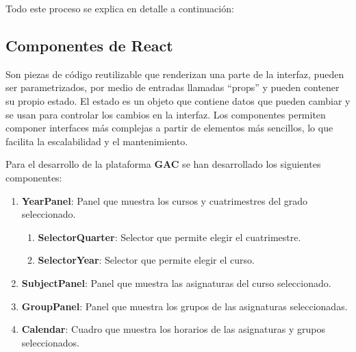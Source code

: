 Todo este proceso se explica en detalle a continuación:\newline

\subsection{Componentes de React}

Son piezas de código reutilizable que renderizan una parte de la interfaz, pueden ser parametrizados, por medio de entradas llamadas ``props'' y pueden contener su propio estado. El estado es un objeto que contiene datos que pueden cambiar y se usan para controlar los cambios en la interfaz. Los componentes permiten componer interfaces más complejas a partir de elementos más sencillos, lo que facilita la escalabilidad y el mantenimiento.\newline


Para el desarrollo de la plataforma \textbf{GAC} se han desarrollado los siguientes componentes:

\begin{enumerate}
    \item \textbf{YearPanel}: Panel que muestra los cursos y cuatrimestres del grado seleccionado.
    \begin{enumerate}
        \item \textbf{SelectorQuarter}: Selector que permite elegir el cuatrimestre.
        \item \textbf{SelectorYear}: Selector que permite elegir el curso.
    \end{enumerate}
    \item \textbf{SubjectPanel}: Panel que muestra las asignaturas del curso seleccionado.
    \item \textbf{GroupPanel}: Panel que muestra los grupos de las asignaturas seleccionadas.
    \item \textbf{Calendar}: Cuadro que muestra los horarios de las asignaturas y grupos seleccionados.
\end{enumerate}

